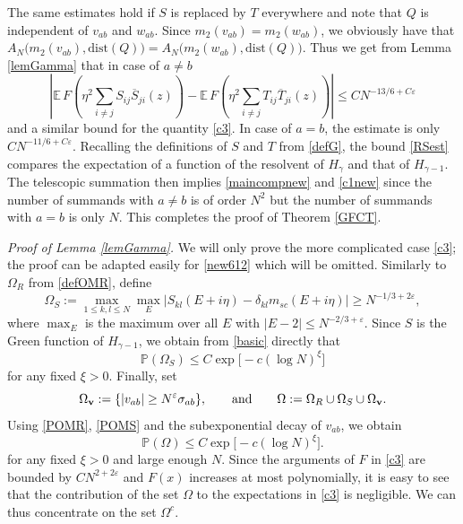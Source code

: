 \documentclass[draft]{article}
\newcommand{\e}{\varepsilon}
\newcommand{\bv}{{\bf{v}}}
\newcommand{\be}{\begin{equation}}
\newcommand{\ee}{\end{equation}}
\newcommand{\E}{{\mathbb E }}
\renewcommand{\P}{{\mathbb P}}
\newcommand{\qed}{\hfill\fbox{}\par\vspace{0.3mm}}
\numberwithin{equation}{section}
\numberwithin{theorem}{section}
\numberwithin{definition}{section}
\numberwithin{remark}{section}
\begin{document}
The same estimates hold if $S$ is replaced by $T$ everywhere
and note that $Q$ is independent of $v_{ab}$ and
$w_{ab}$. Since $m_2(v_{ab})=m_2(w_{ab})$, we obviously 
have that $A_N\big(m_2(v_{ab}), \mbox{dist}(Q)\big)
=A_N\big(m_2(w_{ab}), \mbox{dist}(Q)\big)$.
Thus we get from Lemma \ref{lemGamma} that in case of $a\ne b$
\be\label{RSest}
  \left|\E\, F \left (\eta^2 \sum_{i\neq j}S_{ij}\overline{S}_{ji}(z) \right ) -
  \E\, F \left (\eta^2 \sum_{i\neq j}T_{ij}\overline{T}_{ji}(z) \right ) \right|
  \le CN^{-13/6+C\e}
\ee
and a similar bound for the quantity \eqref{c3}. In case of $a=b$, the
estimate is only $CN^{-11/6+C\e}$.
Recalling the definitions of $S$ and $T$ from \eqref{defG},
the bound \eqref{RSest} compares
the expectation of a function of the resolvent of $H_\gamma$ and that of $H_{\gamma-1}$.
 The telescopic summation then implies
\eqref{maincompnew} and  \eqref{c1new}
since the number of summands with $a\ne b$ is of order $N^2$ but the number
of summands with $a=b$ is only $N$. This completes
 the proof of Theorem \ref{GFCT}.
\qed 

\bigskip



{\it Proof of Lemma \ref{lemGamma}. } We will only prove the more complicated case 
\eqref{c3}; the 
proof can be adapted easily  for  \eqref{new612} which will be omitted. 
Similarly to  $\Omega_R$ from \eqref{defOMR}, 
define
$$
   \Omega_S:= \max_{1 \le k,l \le N}  
 \max_{E}\big| S_{k l}(E+i\eta) -\delta_{kl}m_{sc}(E+i \eta)
\big|\ge N^{-1/3+2\e},
$$
where $\max_E$ is the maximum over all $E$ with $|E-2|\le N^{-2/3+\e}$.
Since $S$ is the Green function of $H_{\gamma-1}$, 
we obtain from \eqref{basic} directly that
\be
   \P (\Omega_S)\le  C\exp{\big[-c(\log N)^\xi\big]}
\label{POMS}
\ee
for any fixed $\xi>0$. Finally, set
\be\label{OMDEF}
\Omega_\bv:=\{ |v_{ab}|\ge N^{\e}\sigma_{ab}\}, \qquad \mbox{and}\qquad
\Omega:= \Omega_R \cup \Omega_S\cup \Omega_\bv.
\ee
Using \eqref{POMR}, \eqref{POMS} and the subexponential decay
of $v_{ab}$, we obtain 
\be\label{28}
\P\left(\Omega\right)\le C\exp{\big[-c(\log N)^\xi\big]}.
\ee
for any fixed $\xi>0$ and large enough $N$.
Since the arguments of $F$ in \eqref{c3}
are bounded by $CN^{2+2\e}$ and $F(x)$ increases at most
polynomially, it is easy to see that the contribution
of the set $\Omega$
to the expectations  in \eqref{c3} is negligible.
We can thus concentrate on the set $\Omega^c$.
\end{document}
